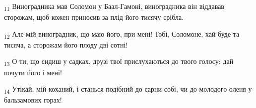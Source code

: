 \begin{tcolorbox}
\textsubscript{11} Виноградника мав Соломон у Баал-Гамоні, виноградника він віддавав сторожам, щоб кожен приносив за плід його тисячу срібла.
\end{tcolorbox}
\begin{tcolorbox}
\textsubscript{12} Але мій виноградник, що маю його, при мені! Тобі, Соломоне, хай буде та тисяча, а сторожам його плоду дві сотні!
\end{tcolorbox}
\begin{tcolorbox}
\textsubscript{13} О ти, що сидиш у садках, друзі твої прислухаються до твого голосу: дай почути його і мені!
\end{tcolorbox}
\begin{tcolorbox}
\textsubscript{14} Утікай, мій коханий, і станься подібний до сарни собі, чи до молодого оленя у бальзамових горах!
\end{tcolorbox}
